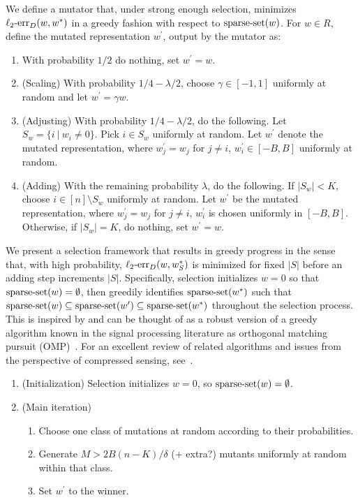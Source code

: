 We define a mutator that, under strong enough selection,
minimizes $\mathrm{\ell_2\mbox{-}err}_D(w, w^*)$ in a greedy fashion with respect to $\mathrm{sparse\mbox{-}set}(w)$.
For $w \in R$, define the mutated representation $w^\prime$, output by the mutator as:
\begin{enumerate}
\item With probability $1/2$ do nothing, set $w^\prime = w$.
\item (Scaling) With probability $1/4 - \lambda/2$, choose $\gamma \in [-1, 1]$
uniformly at random and let $w^\prime = \gamma w$.
\item (Adjusting) With probability $1/4 - \lambda/2$, do the following.
Let $S_w = \{ i~|~ w_i \neq 0\}$. Pick $i \in S_w$ uniformly at random.
Let $w^\prime$ denote the mutated representation, where
$w^\prime_j = w_j$ for $j \neq i$, $w^\prime_i \in [-B, B]$ uniformly at random.
\item (Adding) With the remaining probability $\lambda$, do the following.
If $|S_w| < K$, choose $i \in [n] \setminus S_w$ uniformly at random.
Let $w^\prime$ be the mutated representation, where $w_j^\prime = w_j$ for
$j \neq i$, $w^\prime_i$ is chosen uniformly in $[-B, B]$.
Otherwise, if $|S_w| = K$, do nothing, set $w^\prime = w$.
\end{enumerate}

We present a selection framework that results in greedy progress in the sense
that, with high probability, $\mathrm{\ell_2\mbox{-}err}_D(w, w^*_S)$ is minimized for fixed $|S|$
before an adding step increments $|S|$.
Specifically, selection initializes $w = 0$ so that $\mathrm{sparse\mbox{-}set}(w) = \emptyset$,
then greedily identifies $\mathrm{sparse\mbox{-}set}(w^*)$ such that
$\mathrm{sparse\mbox{-}set}(w) \subseteq \mathrm{sparse\mbox{-}set}(w^\prime) \subseteq \mathrm{sparse\mbox{-}set}(w^*)$
throughout the selection process.
This is inspired by and can be thought of as a robust version of a
greedy algorithm known in the signal processing literature as
orthogonal matching pursuit (OMP)~\cite{donoho48,tropp156}.
For an excellent review of related algorithms and issues from the perspective
of compressed sensing, see~\cite{donoho}.

\begin{enumerate}
\item (Initialization) Selection initializes $w = 0$, so $\mathrm{sparse\mbox{-}set}(w) = \emptyset$.
\item (Main iteration)
	\begin{enumerate}
	\item Choose one class of mutations at random according to their probabilities.
	\item Generate $M > 2B(n - K) / \delta$ (+ extra?) mutants uniformly at random within that class.
	\item Set $w^\prime$ to the winner.
	\end{enumerate}
\end{enumerate}


